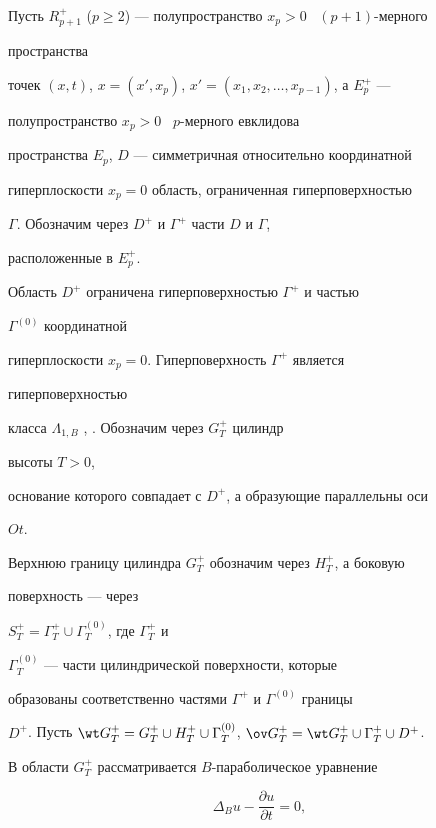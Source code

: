  


 


Пусть $R^+_{p+1}$ ($p\ge2$) --- полупространство $x_p>0$ \ $(p+1)$-мерного 


пространства 


точек $(x,t)$, $x=(x',x_p)$, $x'=(x_1,x_2,\dotsc,x_{p-1})$, а $E^+_p$ --- 


полупространство $x_p>0$ \ $p$-мерного евклидова 


пространства $E_p$, $D$ --- симметричная относительно координатной 


гиперплоскости $x_p=0$ область, ограниченная гиперповерхностью 


$\Gamma$. Обозначим через $D^+$ и $\Gamma^+$ части $D$ и $\Gamma$, 


расположенные в $E^+_p$. 


Область $D^+$ ограничена гиперповерхностью $\Gamma^+$ и частью 


$\Gamma^{(0)}$ координатной 


гиперплоскости $x_p=0$. Гиперповерхность $\Gamma^+$ является 


гиперповерхностью 


класса $\Lambda_{1,B}$ \cite{1}, \cite{2}. Обозначим через $G^+_T$ цилиндр 


высоты $T>0$, 


основание которого совпадает с $D^+$, а образующие параллельны оси 


$Ot$. 


Верхнюю границу цилиндра $G^+_T$ обозначим через $H^+_T$, а боковую 


поверхность --- через 


$S^+_T=\Gamma^+_T\cup\Gamma^{(0)}_T$, где $\Gamma^+_T$ и 


$\Gamma^{(0)}_T$ --- части цилиндрической поверхности, которые 


образованы соответственно частями $\Gamma^+$ и $\Gamma^{(0)}$ границы 


$D^+$. Пусть $\wt G^+_T=G^+_T\cup H^+_T\cup\Gamma^{(0)}_T$, $\ov 


G^+_T=\wt G^+_T\cup\Gamma^+_T\cup D^+$. 


 


В области $G^+_T$ рассматривается $B$-параболическое уравнение 


\begin{equation} 


\Delta_B u-\frac{\partial u}{\partial t}=0, 


\end{equation} 


